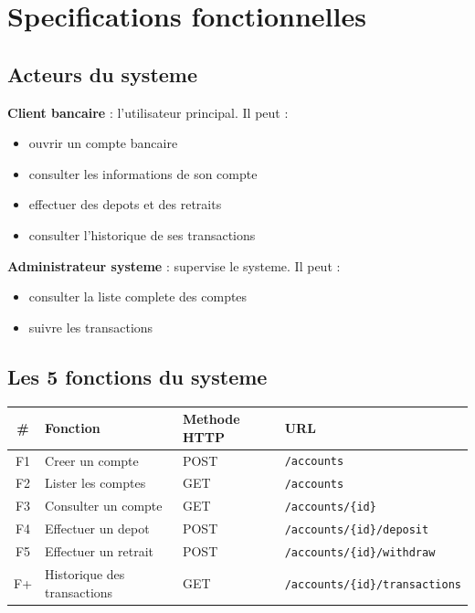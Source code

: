 \documentclass[12pt,a4paper]{article}
\begin{document}
\section{Specifications fonctionnelles}

\subsection{Acteurs du systeme}

\textbf{Client bancaire} : l'utilisateur principal. Il peut :
\begin{itemize}[noitemsep]
  \item ouvrir un compte bancaire
  \item consulter les informations de son compte
  \item effectuer des depots et des retraits
  \item consulter l'historique de ses transactions
\end{itemize}

\textbf{Administrateur systeme} : supervise le systeme. Il peut :
\begin{itemize}[noitemsep]
  \item consulter la liste complete des comptes
  \item suivre les transactions
\end{itemize}

\subsection{Les 5 fonctions du systeme}

\begin{center}
\begin{tabular}{clll}
\toprule
\textbf{\#} & \textbf{Fonction} & \textbf{Methode HTTP} & \textbf{URL} \\
\midrule
F1 & Creer un compte & POST & \texttt{/accounts} \\
F2 & Lister les comptes & GET & \texttt{/accounts} \\
F3 & Consulter un compte & GET & \texttt{/accounts/\{id\}} \\
F4 & Effectuer un depot & POST & \texttt{/accounts/\{id\}/deposit} \\
F5 & Effectuer un retrait & POST & \texttt{/accounts/\{id\}/withdraw} \\
F+ & Historique des transactions & GET & \texttt{/accounts/\{id\}/transactions} \\
\bottomrule
\end{tabular}
\end{center}
\end{document}

